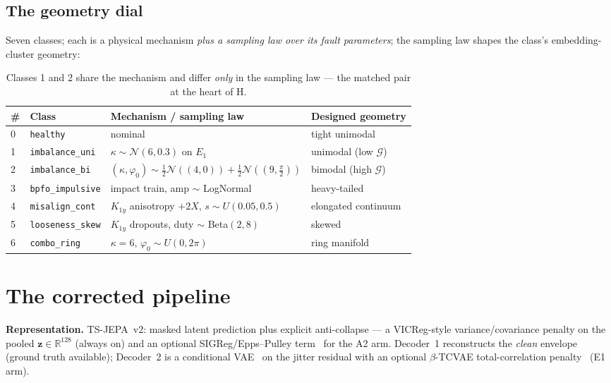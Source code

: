 \documentclass[11pt]{article}
\newcommand{\z}{\mathbf{z}}
\newcommand{\Gng}{\mathcal{G}}
\newcommand{\code}[1]{\texttt{\small #1}}
\begin{document}
\subsection{The geometry dial}
\label{sec:dial}
Seven classes; each is a physical mechanism \emph{plus a sampling law over
its fault parameters}; the sampling law shapes the class's embedding-cluster
geometry:

\begin{table}[h]\centering\small
\begin{tabular}{llll}
\toprule
\# & Class & Mechanism / sampling law & Designed geometry\\
\midrule
0 & \code{healthy} & nominal & tight unimodal\\
1 & \code{imbalance\_uni} & $\kappa\!\sim\!\mathcal{N}(6,0.3)$ on $E_1$ & unimodal (low $\Gng$)\\
2 & \code{imbalance\_bi} & $(\kappa,\varphi_0)\!\sim\!\tfrac12\mathcal{N}((4,0))+\tfrac12\mathcal{N}((9,\tfrac{\pi}{2}))$ & bimodal (high $\Gng$)\\
3 & \code{bpfo\_impulsive} & impact train, amp $\sim$ LogNormal & heavy-tailed\\
4 & \code{misalign\_cont} & $K_{1y}$ anisotropy $+2X$, $s\!\sim\!U(0.05,0.5)$ & elongated continuum\\
5 & \code{looseness\_skew} & $K_{1y}$ dropouts, duty $\sim$ Beta$(2,8)$ & skewed\\
6 & \code{combo\_ring} & $\kappa=6$, $\varphi_0\!\sim\!U(0,2\pi)$ & ring manifold\\
\bottomrule
\end{tabular}
\caption{Classes 1 and 2 share the mechanism and differ \emph{only} in the
sampling law --- the matched pair at the heart of H.}
\end{table}

\section{The corrected pipeline}
\label{sec:pipeline}

\textbf{Representation.} TS-JEPA~v2: masked latent prediction plus explicit
anti-collapse --- a VICReg-style variance/covariance penalty on the pooled
$\z\in\mathbb{R}^{128}$ (always on) and an optional SIGReg/Epps--Pulley
term~\cite{balestriero2025lejepa} for the A2 arm. Decoder~1 reconstructs the
\emph{clean} envelope (ground truth available); Decoder~2 is a conditional
VAE~\cite{sohn2015cvae} on the jitter residual with an optional
$\beta$-TCVAE total-correlation penalty~\cite{chen2018isolating} (E1 arm).
\end{document}
